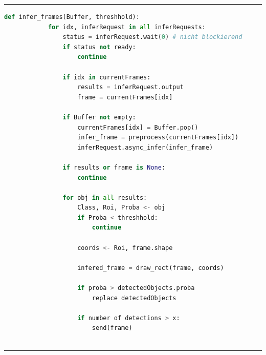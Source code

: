 \begin{center}
    \rule{0.8\textwidth}{0.4pt}
    \begin{lstlisting}[language=Python]
        def infer_frames(Buffer, threshhold):
            for idx, inferRequest in all inferRequests:
                status = inferRequest.wait(0) # nicht blockierend
                if status not ready:
                    continue
                
                if idx in currentFrames:
                    results = inferRequest.output
                    frame = currentFrames[idx]

                if Buffer not empty:
                    currentFrames[idx] = Buffer.pop()
                    infer_frame = preprocess(currentFrames[idx])
                    inferRequest.async_infer(infer_frame)

                if results or frame is None:
                    continue

                for obj in all results:
                    Class, Roi, Proba <- obj
                    if Proba < threshhold:
                        continue
                    
                    coords <- Roi, frame.shape

                    infered_frame = draw_rect(frame, coords)

                    if proba > detectedObjects.proba
                        replace detectedObjects

                    if number of detections > x:
                        send(frame)
                    
    \end{lstlisting}
    \rule{0.8\textwidth}{0.4pt}        
\end{center}







